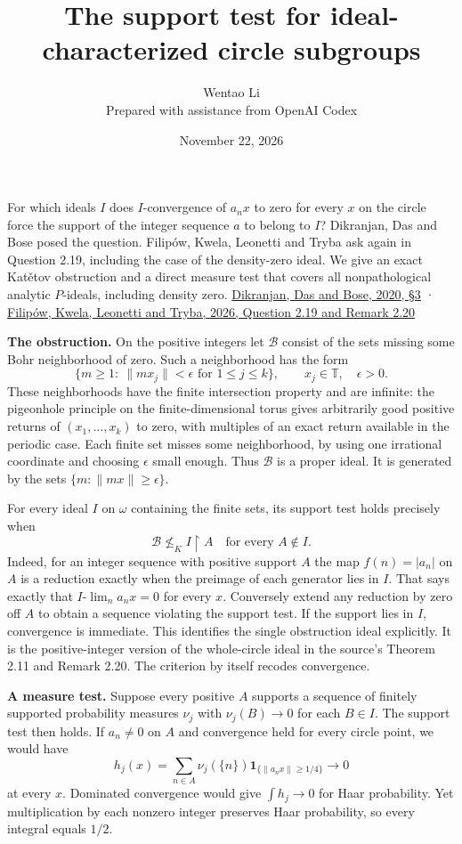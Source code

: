 \documentclass[11pt]{article}
\author{Wentao Li\\\small Prepared with assistance from OpenAI Codex}
\date{November 22, 2026}
\title{The support test for ideal-characterized circle subgroups}
\begin{document}
\maketitle
For which ideals \(I\) does \(I\)-convergence of \(a_nx\) to zero for every \(x\) on the circle force the support of the integer sequence \(a\) to belong to \(I\)? Dikranjan, Das and Bose posed the question. Filipów, Kwela, Leonetti and Tryba ask again in Question 2.19, including the case of the density-zero ideal. We give an exact Katětov obstruction and a direct measure test that covers all nonpathological analytic \(P\)-ideals, including density zero. \href{https://www.impan.pl/en/publishing-house/journals-and-series/fundamenta-mathematicae/all/249/2/113188/statistically-characterized-subgroups-of-the-circle}{Dikranjan, Das and Bose, 2020, §3} · \href{https://arxiv.org/abs/2607.12192}{Filipów, Kwela, Leonetti and Tryba, 2026, Question 2.19 and Remark 2.20}

\textbf{The obstruction.} On the positive integers let \(\mathcal B\) consist of the sets missing some Bohr neighborhood of zero. Such a neighborhood has the form \[ \{m\ge1:\ \|mx_j\|<\epsilon\text{ for }1\le j\le k\},\qquad x_j\in\mathbb T,\quad\epsilon>0. \] These neighborhoods have the finite intersection property and are infinite: the pigeonhole principle on the finite-dimensional torus gives arbitrarily good positive returns of \((x_1,\ldots,x_k)\) to zero, with multiples of an exact return available in the periodic case. Each finite set misses some neighborhood, by using one irrational coordinate and choosing \(\epsilon\) small enough. Thus \(\mathcal B\) is a proper ideal. It is generated by the sets \(\{m:\|mx\|\ge\epsilon\}\).

For every ideal \(I\) on \(\omega\) containing the finite sets, its support test holds precisely when \[ \mathcal B\not\le_K I\mathbin{\restriction}A \quad\text{for every } A\notin I. \] Indeed, for an integer sequence with positive support \(A\) the map \(f(n)=|a_n|\) on \(A\) is a reduction exactly when the preimage of each generator lies in \(I\). That says exactly that \(I\text{-}\lim_n a_n x=0\) for every \(x\). Conversely extend any reduction by zero off \(A\) to obtain a sequence violating the support test. If the support lies in \(I\), convergence is immediate. This identifies the single obstruction ideal explicitly. It is the positive-integer version of the whole-circle ideal in the source's Theorem 2.11 and Remark 2.20. The criterion by itself recodes convergence.

\textbf{A measure test.} Suppose every positive \(A\) supports a sequence of finitely supported probability measures \(\nu_j\) with \(\nu_j(B)\to0\) for each \(B\in I\). The support test then holds. If \(a_n\ne0\) on \(A\) and convergence held for every circle point, we would have \[ h_j(x)=\sum_{n\in A}\nu_j(\{n\})\mathbf1_{\{\|a_nx\|\ge1/4\}}\longrightarrow0 \] at every \(x\). Dominated convergence would give \(\int h_j\to0\) for Haar probability. Yet multiplication by each nonzero integer preserves Haar probability, so every integral equals \(1/2\).
\end{document}
